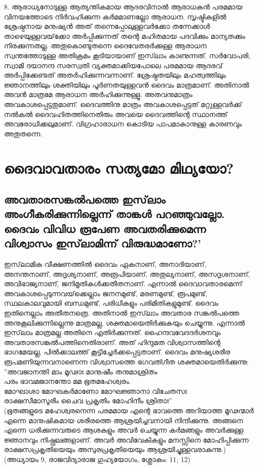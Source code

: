 8. ആരാധ്യനോടുള്ള ആത്യന്തികമായ ആദരവിനാല്‍ ആരാധകന്‍ പരമമായ വിനയത്തോടെ നിര്‍വഹിക്കുന്ന കര്‍മമാണല്ലോ ആരാധന. സൃഷ്ടികളില്‍ ശ്രേഷ്ഠനായ മനുഷ്യന്‍ അത് തന്നെപ്പോലുള്ളവര്‍ക്കോ തന്നേക്കാള്‍ താഴെയുള്ളവയ്‌ക്കോ അര്‍പ്പിക്കുന്നത് തന്റെ മഹിതമായ പദവിക്കും മാന്യതക്കും നിരക്കുന്നതല്ല. അതുകൊണ്ടുതന്നെ ദൈവേതരര്‍ക്കുള്ള ആരാധന സ്വന്തത്തോടുള്ള അതിക്രമം കൂടിയായാണ് ഇസ്‌ലാം കാണുന്നത്. സര്‍വോപരി, സ്വാമി ദയാനന്ദ സരസ്വതി വ്യക്തമാക്കിയപോലെ പരമമായ ആദരവ് അര്‍പ്പിക്കേണ്ടത് അതര്‍ഹിക്കുന്നവന്നാണ്. ശ്രേഷ്ഠതയിലും മഹത്വത്തിലും ജ്ഞാനത്തിലും ശക്തിയിലും പൂര്‍ണതയുള്ളവന്‍ ദൈവം മാത്രമാണ്. അതിനാല്‍ അവന്‍ മാത്രമേ ആരാധന അര്‍ഹിക്കുന്നുള്ളൂ. അതവനുമാത്രം അവകാശപ്പെട്ടതുമാണ്. ദൈവത്തിനു മാത്രം അവകാശപ്പെട്ടത് മറ്റുള്ളവര്‍ക്ക് നല്‍കല്‍ ദൈവഹിതത്തിനെതിരും അവയെ ദൈവത്തിന്റെ സ്ഥാനത്ത് അവരോധിക്കലുമാണ്. വിഗ്രഹാരാധന കൊടിയ പാപമാകാനുള്ള കാരണവും അതുതന്നെ.\\
\chapter{ദൈവാവതാരം സത്യമോ മിഥ്യയോ? }
  \section{അവതാരസങ്കല്‍പത്തെ ഇസ്‌ലാം അംഗീകരിക്കുന്നില്ലെന്ന് താങ്കള്‍ പറഞ്ഞുവല്ലോ. ദൈവം വിവിധ രൂപേണ അവതരിക്കുമെന്ന വിശ്വാസം ഇസ്‌ലാമിന്ന് വിരുദ്ധമാണോ?'}
 ഇസ്‌ലാമിക വീക്ഷണത്തില്‍ ദൈവം ഏകനാണ്, അനാദിയാണ്, അനന്തനാണ്, അദൃശ്യനാണ്, അരൂപിയാണ്, അതുല്യനാണ്, അസദൃശനാണ്, അവിഭാജ്യനാണ്, ജനിമൃതികള്‍ക്കതീതനാണ്. എന്നാല്‍ ദൈവാവതാരമെന്ന് അവകാശപ്പെടുന്നവയ്‌ക്കെല്ലാം ജനനമുണ്ട്, മരണമുണ്ട്, രൂപമുണ്ട്, സ്ഥലകാലവുമായി ബന്ധമുണ്ട്, പരിധികളും പരിമിതികളുമുണ്ട്. ദൈവം ഇതിനെല്ലാം അതീതനത്രെ. അതിനാല്‍ ഇസ്‌ലാം അവതാര സങ്കല്‍പത്തെ അനുകൂലിക്കുന്നില്ലെന്നു മാത്രമല്ല, ശക്തമായെതിര്‍ക്കുകയും ചെയ്യുന്നു. എന്നാല്‍ ഇസ്‌ലാം മാത്രമല്ല അതിനെ എതിര്‍ക്കുന്നത്. ഹൈന്ദവവേദദര്‍ശനവും അവതാരസങ്കല്‍പത്തിനെതിരാണ്. അത് ഹിന്ദുമത വിശ്വാസത്തിന്റെ ഭാഗമേയല്ല, പില്‍ക്കാലത്ത് കൂട്ടിച്ചേര്‍ക്കപ്പെട്ടതാണ്. 
ദൈവം മനുഷ്യശരീര രൂപമണിയുന്നവനാണെന്ന വിശ്വാസത്തെ ഭഗവത്ഗീത ശക്തമായെതിര്‍ക്കുന്നു:\\
''അവജാനന്തി മാം മൂഢാഃ മാനുഷീം തനുമാശ്രിതം\\
പരം ഭാവമജാനന്തോ മമ ഭൂതമഹേശ്വരം.\\
മോഘാശാ മോഘകര്‍മാണോ മോഘജ്ഞാനാ വിചേതസഃ\\
രാക്ഷസീമാസൂരീം ചൈവ പ്രകൃതിം മോഹിനീം ശ്രിതാഃ''\\
(ഭൂതങ്ങളുടെ മഹേശ്വരനെന്ന പരമമായ എന്റെ ഭാവത്തെ അറിയാത്ത മൂഢന്മാര്‍ എന്നെ മാനുഷികമായ ശരീരത്തെ ആശ്രയിച്ചവനായി നിന്ദിക്കുന്നു. അങ്ങനെ എന്നെ ധരിക്കുന്നവരുടെ ആശകളും അവര്‍ ചെയ്യുന്ന കര്‍മങ്ങളും അവര്‍ക്കുള്ള ജ്ഞാനവും നിഷ്ഫലങ്ങളാണ്. അവര്‍ അവിവേകികളും മനസ്സിനെ മോഹിപ്പിക്കുന്ന രാക്ഷസപ്രകൃതിയെയും അസുരപ്രകൃതിയെയും ആശ്രയിച്ചുള്ളവരാകുന്നു.) (അധ്യായം 9, രാജവിദ്യാരാജ ഗുഹ്യയോഗം, ശ്ലോകം: 11, 12)

